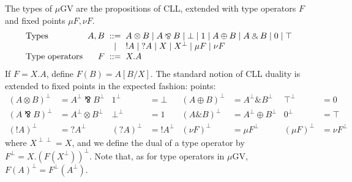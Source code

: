 \documentclass[orivec,envcountsame]{llncs}
\newcommand{\with}{\mathbin\binampersand}
\newcommand{\parr}{\mathbin\bindnasrepma}
\newcommand{\cpdual}[1]{#1^\perp}
\newcommand{\cpbang}[1]{{! #1}}
\newcommand{\cpquery}[1]{{? #1}}
\newcommand{\mkwd}[1]{\mathsf{#1}}
\newcommand{\link}[2]{#1 \leftrightarrow #2}
\newcommand{\cut}[4]{\mkwd{new}\:#1 \: (#3 \mid #4)}
\newcommand{\replicate}[2]{{!#1(#2)}}
\newcommand{\derelict}[2]{{?#1[#2]}}
\newcommand{\rec}[1]{\mkwd{rec}\:#1}
\newcommand{\corec}[5]{\mkwd{corec}\:#1 \langle #2 \rangle (#4,#5)}
\newcommand{\clabel}[1]{\mathrm{#1}}
\renewcommand{\case}[2]{\mkwd{case}\:#1\:\{#2\}}
\newcommand{\sel}[2]{#1[\clabel{#2}]}
\newcommand{\mugv}{$\mu\mathrm{GV}$\xspace}
\begin{document}
The types of \mugv are the propositions of CLL, extended with type operators $F$ and fixed points
$\mu F,\nu F$.
\[\begin{array}{l@{\hspace{2mm}}r@{\hspace{2mm}}c@{\hspace{2mm}}l}
  \text{Types} & A,B & ::= & A \otimes B \mid A \parr B \mid \bot \mid 1 \mid A \oplus B \mid A \with B \mid 0 \mid \top \\
   & & \mid & \cpbang{A} \mid \cpquery{A} \mid X \mid \cpdual{X} \mid \mu F \mid \nu F \\
   \text{Type operators} & F & ::= & X.A %
\end{array}\]
If $F = X.A$, define $F(B) = A[B/X]$.  The standard notion of CLL duality is extended to fixed points in the expected fashion:
points:
\begin{align*}
  \cpdual{(A \otimes B)} &= \cpdual{A} \parr \cpdual{B} & \cpdual{1} &= \bot &
    \cpdual{(A \oplus B)} &= \cpdual{A} \with \cpdual{B} & \cpdual{\top} &= 0 \\
  \cpdual{(A \parr B)} &= \cpdual{A} \otimes \cpdual{B} & \cpdual{\bot} &= 1 &
    \cpdual{(A \with B)} &= \cpdual{A} \oplus \cpdual{B} & \cpdual{0} &= \top \\
  \cpdual{(\cpbang{A})} &= \cpquery{\cpdual{A}} & \cpdual{(\cpquery{A})} &= \cpbang{\cpdual{A}} &
     \cpdual{(\nu F)} &= \mu \cpdual{F} & \cpdual{(\mu F)} &= \nu \cpdual{F}
\end{align*}
where $X^{\perp\perp}  = X$, and we define the dual of a type operator by $\cpdual{F} =
X.\cpdual{(F(\cpdual{X}))}.$ Note that, as for type operators in \mugv, $\cpdual{F(A)} =
\cpdual{F}(\cpdual{A})$.
\end{document}
